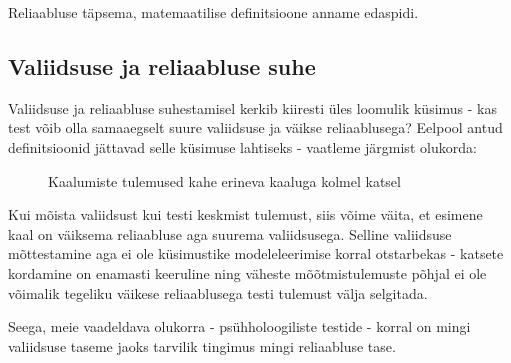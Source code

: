 \documentclass[a4paper,12pt]{article}
\numberwithin{equation}{section}
\theoremstyle{definition}
\begin{document}
Reliaabluse täpsema, matemaatilise definitsioone anname edaspidi. 

\subsection{Valiidsuse ja reliaabluse suhe}

Valiidsuse ja reliaabluse suhestamisel kerkib kiiresti üles loomulik küsimus - kas test võib olla samaaegselt suure valiidsuse ja väikse reliaablusega? Eelpool antud definitsioonid jättavad selle küsimuse lahtiseks - vaatleme järgmist olukorda:

\begin{figure}[H]
\colorbox{background_example}{\parbox{\textwidth}{
}}
\caption{Kaalumiste tulemused kahe erineva kaaluga kolmel katsel}
\end{figure}

Kui mõista valiidsust kui testi keskmist tulemust, siis võime väita, et esimene kaal on väiksema reliaabluse aga suurema valiidsusega. Selline valiidsuse mõttestamine aga ei ole küsimustike modeleleerimise korral otstarbekas - katsete kordamine on enamasti keeruline ning väheste mõõtmistulemuste põhjal ei ole võimalik tegeliku väikese reliaablusega testi tulemust välja selgitada. 

Seega, meie vaadeldava olukorra - psühholoogiliste testide - korral on mingi valiidsuse taseme jaoks tarvilik tingimus mingi reliaabluse tase.    
\end{document}
